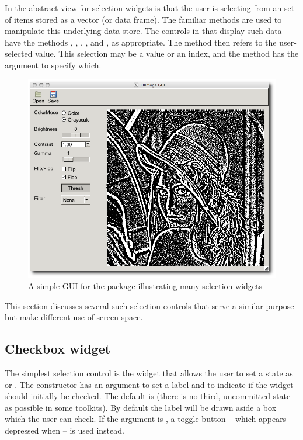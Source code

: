 In  the abstract view for selection widgets is that the
user is selecting from an set of items stored as a vector (or data
frame). The familiar \R\/ methods are used to manipulate this
underlying data store. The controls in  that display
such data have the methods \code{[}, \code{[\ASSIGN}, ,
,  and , as appropriate. The
 method then refers to the user-selected value. This
selection may be a value or an index, and the  method has
the argument  to specify which.

\begin{figure}
  \centering
  \includegraphics[width=.75\textwidth]{fig-gWidgets-EBImage-gui}
  \caption{A simple GUI for the  package illustrating many selection widgets}
  \label{fig:gWidgets-EBImage-gui}
\end{figure}

This section discusses several such selection controls that serve a
similar purpose but make different use of screen space.

\subsection{Checkbox widget}
\label{sec:gWidgets-checkbox-widget}

The simplest selection control is the  widget
that allows the user to set a state as  or
. The constructor has an argument
 to set a label and
 to indicate if the widget should
initially be checked. The default is  (there is no third,
uncommitted state as possible in some toolkits). By default the label
will be drawn aside a box which the user can check. If the argument
 is , a toggle button
-- which appears depressed when  -- is used instead.

